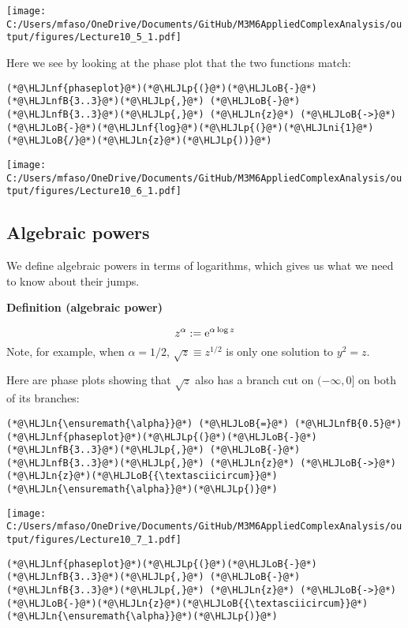 \documentclass[12pt,a4paper]{article}
\newcommand{\HLJLn}[1]{#1}
\newcommand{\HLJLnf}[1]{\textcolor[RGB]{66,102,213}{#1}}
\newcommand{\HLJLnfB}[1]{\textcolor[RGB]{59,151,46}{#1}}
\newcommand{\HLJLni}[1]{\textcolor[RGB]{59,151,46}{#1}}
\newcommand{\HLJLoB}[1]{\textcolor[RGB]{102,102,102}{\textbf{#1}}}
\newcommand{\HLJLp}[1]{#1}
\def\E{ {\rm e} }
\begin{document}
\texttt{[image: C:/Users/mfaso/OneDrive/Documents/GitHub/M3M6AppliedComplexAnalysis/output/figures/Lecture10\_5\_1.pdf]}

Here we see by looking at the phase plot that the two functions match:


\begin{lstlisting}
(*@\HLJLnf{phaseplot}@*)(*@\HLJLp{(}@*)(*@\HLJLoB{-}@*)(*@\HLJLnfB{3..3}@*)(*@\HLJLp{,}@*) (*@\HLJLoB{-}@*)(*@\HLJLnfB{3..3}@*)(*@\HLJLp{,}@*) (*@\HLJLn{z}@*) (*@\HLJLoB{->}@*) (*@\HLJLoB{-}@*)(*@\HLJLnf{log}@*)(*@\HLJLp{(}@*)(*@\HLJLni{1}@*)(*@\HLJLoB{/}@*)(*@\HLJLn{z}@*)(*@\HLJLp{))}@*)
\end{lstlisting}

\texttt{[image: C:/Users/mfaso/OneDrive/Documents/GitHub/M3M6AppliedComplexAnalysis/output/figures/Lecture10\_6\_1.pdf]}

\subsection{Algebraic powers}
We define algebraic powers in terms of logarithms, which gives us what we need to know about their jumps.

\textbf{Definition (algebraic power)}

\[
z^\alpha := \E^{\alpha \log z}
\]
Note, for example, when $\alpha = 1/2$, $\sqrt z \equiv z^{1/2}$ is only one solution to $y^2 = z$.

Here are phase plots showing that $\sqrt{z}$ also has a branch cut on $(-\infty,0]$ on both of its branches:


\begin{lstlisting}
(*@\HLJLn{\ensuremath{\alpha}}@*) (*@\HLJLoB{=}@*) (*@\HLJLnfB{0.5}@*)
(*@\HLJLnf{phaseplot}@*)(*@\HLJLp{(}@*)(*@\HLJLoB{-}@*)(*@\HLJLnfB{3..3}@*)(*@\HLJLp{,}@*) (*@\HLJLoB{-}@*)(*@\HLJLnfB{3..3}@*)(*@\HLJLp{,}@*) (*@\HLJLn{z}@*) (*@\HLJLoB{->}@*) (*@\HLJLn{z}@*)(*@\HLJLoB{{\textasciicircum}}@*)(*@\HLJLn{\ensuremath{\alpha}}@*)(*@\HLJLp{)}@*)
\end{lstlisting}

\texttt{[image: C:/Users/mfaso/OneDrive/Documents/GitHub/M3M6AppliedComplexAnalysis/output/figures/Lecture10\_7\_1.pdf]}

\begin{lstlisting}
(*@\HLJLnf{phaseplot}@*)(*@\HLJLp{(}@*)(*@\HLJLoB{-}@*)(*@\HLJLnfB{3..3}@*)(*@\HLJLp{,}@*) (*@\HLJLoB{-}@*)(*@\HLJLnfB{3..3}@*)(*@\HLJLp{,}@*) (*@\HLJLn{z}@*) (*@\HLJLoB{->}@*) (*@\HLJLoB{-}@*)(*@\HLJLn{z}@*)(*@\HLJLoB{{\textasciicircum}}@*)(*@\HLJLn{\ensuremath{\alpha}}@*)(*@\HLJLp{)}@*)
\end{lstlisting}
\end{document}
